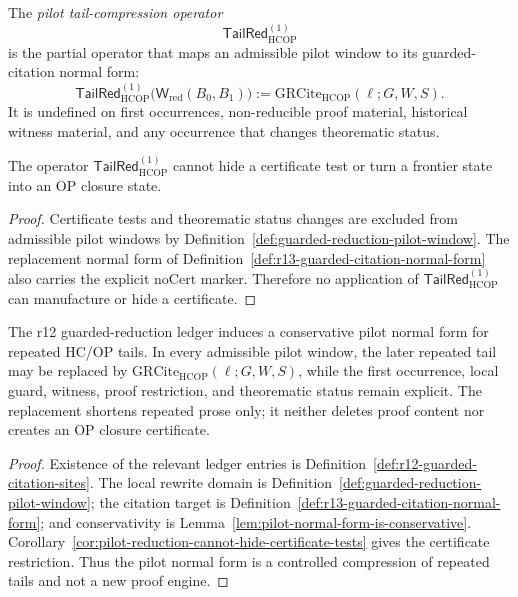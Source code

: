 \begin{definition}
\label{def:pilot-tail-compression-operator}
The \emph{pilot tail-compression operator}
\[
  \mathsf{TailRed}_{\mathrm{HCOP}}^{(1)}
\]
is the partial operator that maps an admissible pilot window to its guarded-citation normal form:
\[
  \mathsf{TailRed}_{\mathrm{HCOP}}^{(1)}
  \bigl(\mathsf W_{\mathrm{red}}(B_0,B_1)\bigr)
  :=
  \mathrm{GRCite}_{\mathrm{HCOP}}(\ell;G,W,S).
\]
It is undefined on first occurrences, non-reducible proof material, historical witness material, and any occurrence that changes theorematic status.
\end{definition}

\begin{corollary}
\label{cor:pilot-reduction-cannot-hide-certificate-tests}
The operator \(\mathsf{TailRed}_{\mathrm{HCOP}}^{(1)}\) cannot hide a certificate test or turn a frontier state into an OP closure state.
\end{corollary}

\begin{proof}
Certificate tests and theorematic status changes are excluded from admissible pilot windows by Definition~\ref{def:guarded-reduction-pilot-window}. The replacement normal form of Definition~\ref{def:r13-guarded-citation-normal-form} also carries the explicit \(\mathrm{noCert}\) marker. Therefore no application of \(\mathsf{TailRed}_{\mathrm{HCOP}}^{(1)}\) can manufacture or hide a certificate.
\end{proof}

\begin{theorem}
\label{thm:first-guarded-reduction-pilot-normal-form}
The r12 guarded-reduction ledger induces a conservative pilot normal form for repeated HC/OP tails. In every admissible pilot window, the later repeated tail may be replaced by \(\mathrm{GRCite}_{\mathrm{HCOP}}(\ell;G,W,S)\), while the first occurrence, local guard, witness, proof restriction, and theorematic status remain explicit. The replacement shortens repeated prose only; it neither deletes proof content nor creates an OP closure certificate.
\end{theorem}

\begin{proof}
Existence of the relevant ledger entries is Definition~\ref{def:r12-guarded-citation-sites}. The local rewrite domain is Definition~\ref{def:guarded-reduction-pilot-window}; the citation target is Definition~\ref{def:r13-guarded-citation-normal-form}; and conservativity is Lemma~\ref{lem:pilot-normal-form-is-conservative}. Corollary~\ref{cor:pilot-reduction-cannot-hide-certificate-tests} gives the certificate restriction. Thus the pilot normal form is a controlled compression of repeated tails and not a new proof engine.
\end{proof}

